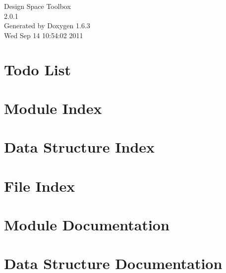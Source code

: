 \documentclass[a4paper]{book}
\begin{document}
\hypersetup{pageanchor=false}
\begin{titlepage}
\vspace*{7cm}
\begin{center}
{\Large Design Space Toolbox \\[1ex]\large 2.0.1 }\\
\vspace*{1cm}
{\large Generated by Doxygen 1.6.3}\\
\vspace*{0.5cm}
{\small Wed Sep 14 10:54:02 2011}\\
\end{center}
\end{titlepage}
\clearemptydoublepage
{}
\tableofcontents
\clearemptydoublepage
{}
\hypersetup{pageanchor=true}
\chapter{Todo List}
\label{todo}
\hypertarget{todo}{}

\chapter{Module Index}

\chapter{Data Structure Index}

\chapter{File Index}

\chapter{Module Documentation}







\chapter{Data Structure Documentation}


























\end{document}

